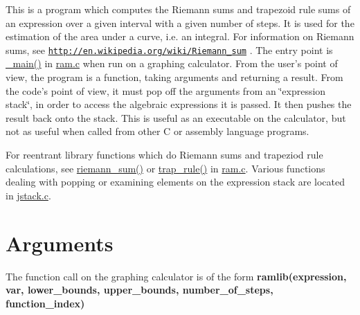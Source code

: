 This is a program which computes the Riemann sums and trapezoid rule sums of an expression over a given interval with a given number of steps. It is used for the estimation of the area under a curve, i.e. an integral. For information on Riemann sums, see \href{http://en.wikipedia.org/wiki/Riemann_sum}{\tt http://en.wikipedia.org/wiki/Riemann\_\-sum} . The entry point is \hyperlink{ram_8c_aa212f497d0e60a46a30582320c2fefef}{\_\-main()} in \hyperlink{ram_8c}{ram.c} when run on a graphing calculator. From the user's point of view, the program is a function, taking arguments and returning a result. From the code's point of view, it must pop off the arguments from an \char`\"{}expression stack\char`\"{}, in order to access the algebraic expressions it is passed. It then pushes the result back onto the stack. This is useful as an executable on the calculator, but not as useful when called from other C or assembly language programs.

For reentrant library functions which do Riemann sums and trapeziod rule calculations, see \hyperlink{ram_8c_a549bc93c3536bde8ffbcca9bb5035fda}{riemann\_\-sum()} or \hyperlink{ram_8c_a0415ba140e87ce3dca1acc1017f36fc7}{trap\_\-rule()} in \hyperlink{ram_8c}{ram.c}. Various functions dealing with popping or examining elements on the expression stack are located in \hyperlink{jstack_8c}{jstack.c}.\hypertarget{index_Arguments}{}\section{Arguments}\label{index_Arguments}
The function call on the graphing calculator is of the form {\bfseries  ramlib(expression, var, lower\_\-bounds, upper\_\-bounds, number\_\-of\_\-steps, function\_\-index) }


